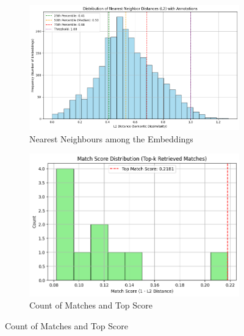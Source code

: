 \begin{figure}[H]
    \centering
    
    \begin{subfigure}[b]{0.496\textwidth}
        \centering
        \includegraphics[width=\textwidth]{Images/RAG_NEAR.png}
        \caption*{Nearest Neighbours among the Embeddings}
        \label{fig:wellbeing_result}
    \end{subfigure}
    \hfill
    \begin{subfigure}[b]{0.496\textwidth}
        \centering
        \includegraphics[width=\textwidth]{Images/RAG_MATCHSCORE.png}
        \caption*{Count of Matches and Top Score}
        \label{fig:wellbeing_questions}
    \end{subfigure}
   
    \label{fig:wellbeing_comparison}
\end{figure}


